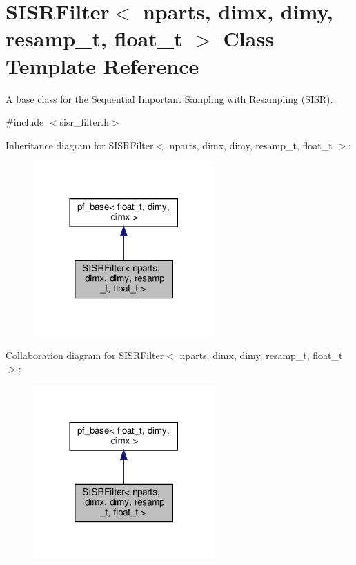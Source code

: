 \hypertarget{classSISRFilter}{}\section{S\+I\+S\+R\+Filter$<$ nparts, dimx, dimy, resamp\+\_\+t, float\+\_\+t $>$ Class Template Reference}
\label{classSISRFilter}


A base class for the Sequential Important Sampling with Resampling (S\+I\+SR).  




{\ttfamily \#include $<$sisr\+\_\+filter.\+h$>$}



Inheritance diagram for S\+I\+S\+R\+Filter$<$ nparts, dimx, dimy, resamp\+\_\+t, float\+\_\+t $>$\+:
\nopagebreak
\begin{figure}[H]
\begin{center}
\leavevmode
\includegraphics[width=197pt]{classSISRFilter__inherit__graph}
\end{center}
\end{figure}


Collaboration diagram for S\+I\+S\+R\+Filter$<$ nparts, dimx, dimy, resamp\+\_\+t, float\+\_\+t $>$\+:
\nopagebreak
\begin{figure}[H]
\begin{center}
\leavevmode
\includegraphics[width=197pt]{classSISRFilter__coll__graph}
\end{center}
\end{figure}
